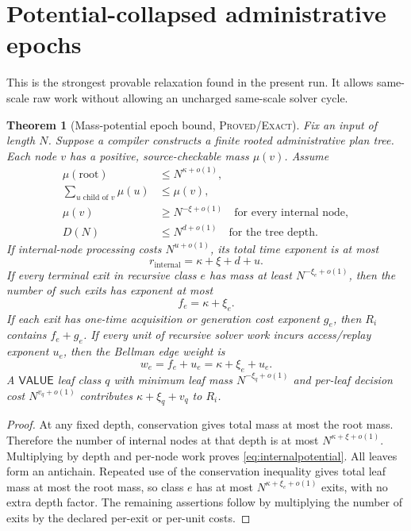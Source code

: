 \documentclass[11pt]{article}
\newtheorem{theorem}{Theorem}[section]
\newcommand{\VALUE}{\mathsf{VALUE}}
\begin{document}
\section{Potential-collapsed administrative epochs}\label{sec:potential}

This is the strongest provable relaxation found in the present run.  It
allows same-scale raw work without allowing an uncharged same-scale solver
cycle.

\begin{theorem}[Mass-potential epoch bound, \textsc{Proved/Exact}]
Fix an input of length \(N\).  Suppose a compiler constructs a finite rooted
administrative plan tree.  Each node \(v\) has a positive, source-checkable
mass \(\mu(v)\).  Assume
\begin{align*}
 \mu(\mathrm{root})&\le N^{\kappa+o(1)},\\
 \sum_{u\text{ child of }v}\mu(u)&\le\mu(v),\\
 \mu(v)&\ge N^{-\xi+o(1)}\quad\text{for every internal node},\\
 D(N)&\le N^{d+o(1)}\quad\text{for the tree depth}.
\end{align*}
If internal-node processing costs \(N^{u+o(1)}\), its total time exponent is
at most
\begin{equation}
 r_{\mathrm{internal}}=\kappa+\xi+d+u.\label{eq:internalpotential}
\end{equation}
If every terminal exit in recursive class \(e\) has mass at least
\(N^{-\xi_e+o(1)}\), then the number of such exits has exponent at most
\begin{equation}
 f_e=\kappa+\xi_e.\label{eq:exitpotential}
\end{equation}
If each exit has one-time acquisition or generation cost exponent \(g_e\),
then \(R_i\) contains \(f_e+g_e\).  If every unit of recursive solver work
incurs access/replay exponent \(u_e\), then the Bellman edge weight is
\begin{equation}
 w_e=f_e+u_e=\kappa+\xi_e+u_e.\label{eq:edgepotential}
\end{equation}
A \(\VALUE\) leaf class \(q\) with minimum leaf mass
\(N^{-\xi_q+o(1)}\) and per-leaf decision cost \(N^{v_q+o(1)}\)
contributes \(\kappa+\xi_q+v_q\) to \(R_i\).
\end{theorem}

\begin{proof}
At any fixed depth, conservation gives total mass at most the root mass.
Therefore the number of internal nodes at that depth is at most
\(N^{\kappa+\xi+o(1)}\).  Multiplying by depth and per-node work proves
\eqref{eq:internalpotential}.  All leaves form an antichain.  Repeated use of
the conservation inequality gives total leaf mass at most the root mass, so
class \(e\) has at most \(N^{\kappa+\xi_e+o(1)}\) exits, with no extra depth
factor.  The remaining assertions follow by multiplying the number of exits
by the declared per-exit or per-unit costs.
\end{proof}
\end{document}
